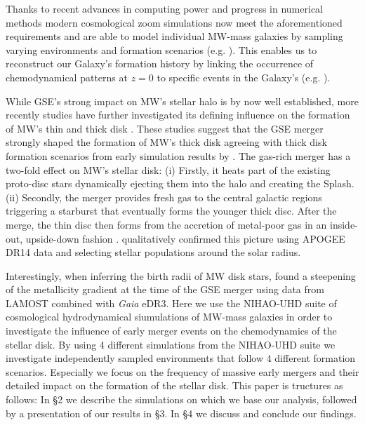 \documentclass[useAMS,usenatbib]{mnras}
\begin{document}
Thanks to recent advances in computing power and progress in numerical methods modern cosmological zoom simulations now meet the aforementioned requirements and are able to model individual MW-mass galaxies by sampling varying environments and formation scenarios (e.g. \citealt{Sawala2016, Grand2017, Buck2020, Font2020, Applebaum2021, Agertz2020Vintergatan, Bird2021, Khoperskov2022-1InSitu, Wetzel2022}). This enables us to reconstruct our Galaxy's formation history by linking the occurrence of chemodynamical patterns at $z=0$ to specific events in the Galaxy's (e.g. \citealt{Bignone2019, Mackereth2019, Fattahi2019, Grand2020, Elias2020, Dillamore2022, Khoperskov2022-2Accreted, Khoperskov2022-3Metallicity, Pagnini2022, Rey2022}).

While GSE's strong impact on MW's stellar halo is by now well established, more recently studies have further investigated its defining influence on the formation of MW's thin and thick disk \citep[e.g.]{Grand2020,Ciuca2022,Orkney2022}. These studies suggest that the GSE merger strongly shaped the formation of MW's thick disk agreeing with thick disk formation scenarios from early simulation results by \cite{Brook_2004, Brook_2006}. The gas-rich merger has a two-fold effect on MW's stellar disk: (i) Firstly, it heats part of the existing proto-disc stars dynamically ejecting them into the halo and creating the Splash. (ii) Secondly, the merger provides fresh gas to the central galactic regions triggering a starburst that eventually forms the younger thick disc. After the merge, the thin disc then forms from the accretion of metal-poor gas in an inside-out, upside-down fashion \citep[e.g.,][]{Bird2013, Grand2018, Buck2020a}. \citet{Ciuca_2021} qualitatively confirmed this picture using APOGEE DR14 data and selecting stellar populations around the solar radius. 

Interestingly, when inferring the birth radii of MW disk stars, \citet{Lu2021} found a steepening of the metallicity gradient at the time of the GSE merger using data from LAMOST combined with {\it Gaia} eDR3. Here we use the NIHAO-UHD suite \citep{Buck2020} of cosmological hydrodynamical siumulations of MW-mass galaxies in order to investigate the influence of early merger events on the chemodynamics of the stellar disk. By using 4 different simulations from the NIHAO-UHD suite we investigate independently sampled environments that follow 4 different formation scenarios. Especially we focus on the frequency of massive early mergers and their detailed impact on the formation of the stellar disk. This paper is tructures as follows: In \S 2 we describe the simulations on which we base our analysis, followed by a presentation of our results in \S 3. In \S 4 we discuss and conclude our findings.
\end{document}
